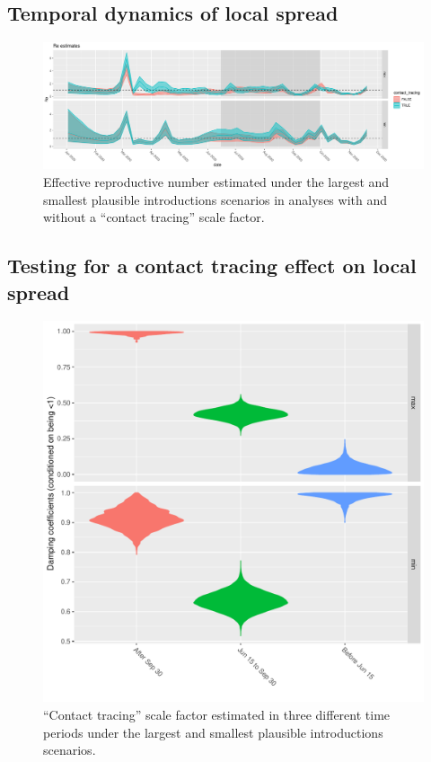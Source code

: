 \documentclass[9pt,twocolumn,twoside,lineno]{pnas-new}
\begin{document}
\subsection{Temporal dynamics of local spread}
\begin{figure}[tbhp]
\centering
\includegraphics[width=.8\linewidth]{figures/Re_noSampUB.pdf}
\caption{Effective reproductive number estimated under the largest and smallest plausible introductions scenarios in analyses with and without a ``contact tracing'' scale factor.}  
\label{fig:scale-factor}
\end{figure}

\subsection{Testing for a contact tracing effect on local spread}

\begin{figure}[tbhp]
\centering
\includegraphics[width=.8\linewidth]{figures/CT_conditionedDamping_noSampUB.pdf}
\caption{``Contact tracing'' scale factor estimated in three different time periods under the largest and smallest plausible introductions scenarios.}  
\label{fig:scale-factor}
\end{figure}
\end{document}
